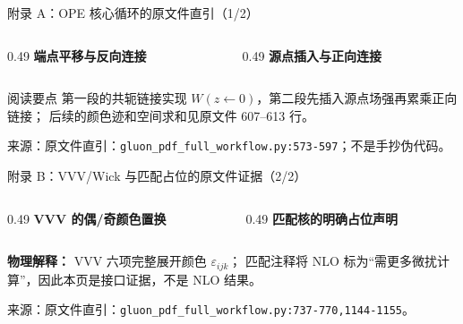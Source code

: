 \documentclass[UTF8,aspectratio=169,11pt]{ctexbeamer}
\newcommand{\source}[1]{%
  \vspace{0.06em}\par{\raggedright\scriptsize\color{muted}来源：#1\par}}
\newcommand{\codepath}[1]{\nolinkurl{#1}}
\begin{document}
\begin{frame}[t]{附录 A：OPE 核心循环的原文件直引（1/2）}
  \begin{columns}[T,totalwidth=\textwidth]
    \begin{column}{0.49\textwidth}
      \scriptsize\textbf{端点平移与反向连接}
      
    \end{column}
    \begin{column}{0.49\textwidth}
      \scriptsize\textbf{源点插入与正向连接}
      
    \end{column}
  \end{columns}
  \vspace{0.12cm}
  \begin{block}{阅读要点}
    第一段的共轭链接实现 \(W(z\leftarrow0)\)，第二段先插入源点场强再累乘正向链接；
    后续的颜色迹和空间求和见原文件 607–613 行。
  \end{block}
  \source{原文件直引：\codepath{gluon_pdf_full_workflow.py:573-597}；不是手抄伪代码。}
\end{frame}

\begin{frame}[t]{附录 B：VVV/Wick 与匹配占位的原文件证据（2/2）}
  \lstset{basicstyle=\ttfamily\tiny,numberstyle=\tiny}
  \begin{columns}[T,totalwidth=\textwidth]
    \begin{column}{0.49\textwidth}
      \scriptsize\textbf{VVV 的偶/奇颜色置换}
      
      
    \end{column}
    \begin{column}{0.49\textwidth}
      \scriptsize\textbf{匹配核的明确占位声明}
      
    \end{column}
  \end{columns}
  \vspace{0.04cm}
  {\scriptsize\textbf{物理解释：} VVV 六项完整展开颜色 \(\varepsilon_{ijk}\)；
  匹配注释将 NLO 标为“需更多微扰计算”，因此本页是接口证据，不是 NLO 结果。\par}
  \source{原文件直引：\codepath{gluon_pdf_full_workflow.py:737-770,1144-1155}。}
\end{frame}
\end{document}
